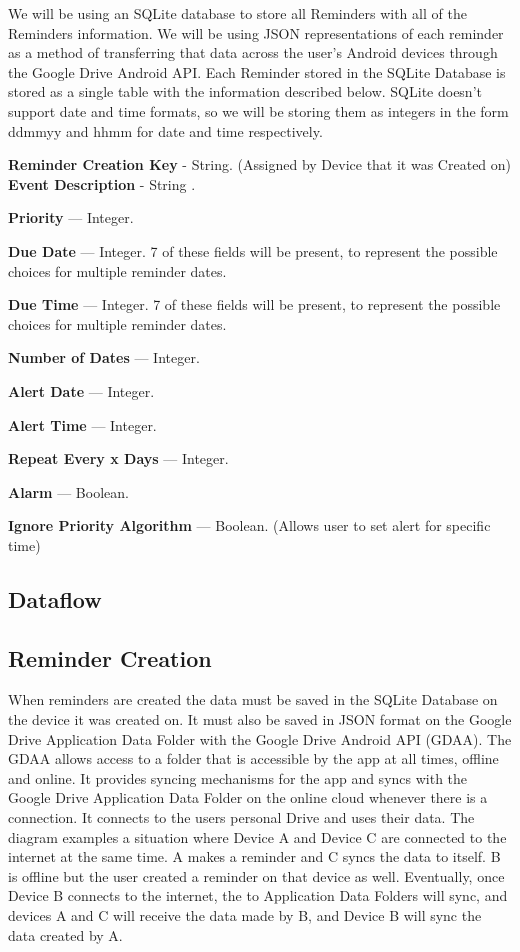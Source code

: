 \documentclass[12pt]{article}
\begin{document}
We will be using an SQLite database to store all Reminders with all of the Reminders information. We will be using JSON representations of each reminder as a method of transferring that data across the user's Android devices through the Google Drive Android API. Each Reminder stored in the SQLite Database is stored as a single table with the information described below. SQLite doesn’t support date and time formats, so we will be storing them as integers in the form ddmmyy and hhmm for date and time respectively.

\textbf{Reminder Creation Key} - String. (Assigned by Device that it was Created on)
\textbf{Event Description} - String .

\textbf{Priority} --- Integer.

\textbf{Due Date} --- Integer. 7 of these fields will be present, to represent the possible choices for multiple reminder dates.

\textbf{Due Time} --- Integer. 7 of these fields will be present, to represent the possible choices for multiple reminder dates.

\textbf{Number of Dates} --- Integer.

\textbf{Alert Date} --- Integer.

\textbf{Alert Time} --- Integer.

\textbf{Repeat Every x Days} --- Integer.

\textbf{Alarm} --- Boolean.

\textbf{Ignore Priority Algorithm} --- Boolean. (Allows user to set alert for specific time)



\subsection{Dataflow}
\subsection{Reminder Creation}
When reminders are created the data must be saved in the SQLite Database on the device it was created on. It must also be saved in JSON format on the Google Drive Application Data Folder with the Google Drive Android API (GDAA). The GDAA allows access to a folder that is accessible by the app at all times, offline and online. It provides syncing mechanisms for the app and syncs with the Google Drive Application Data Folder on the online cloud whenever there is a connection. It connects to the users personal Drive and uses their data. The diagram examples a situation where Device A and Device C are connected to the internet at the same time. A makes a reminder and C syncs the data to itself. B is offline but the user created a reminder on that device as well. Eventually, once Device B connects to the internet, the to Application Data Folders will sync, and devices A and C will receive the data made by B, and Device B will sync the data created by A.
\end{document}
